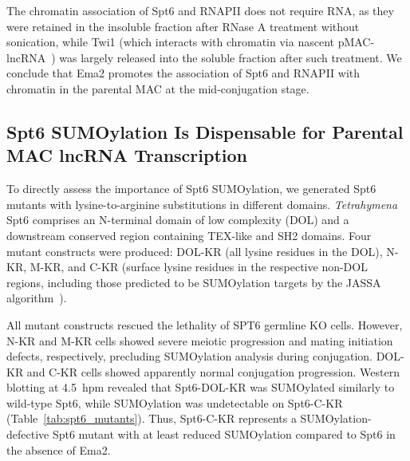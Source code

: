 \documentclass[12pt]{article}
\begin{document}
The chromatin association of Spt6 and RNAPII does not require RNA, as they were retained in the insoluble fraction after RNase A treatment without sonication, while Twi1 (which interacts with chromatin via nascent pMAC-lncRNA~\citep{Aronica2008}) was largely released into the soluble fraction after such treatment.
We conclude that Ema2 promotes the association of Spt6 and RNAPII with chromatin in the parental MAC at the mid-conjugation stage.

\subsection{Spt6 SUMOylation Is Dispensable for Parental MAC lncRNA Transcription}

To directly assess the importance of Spt6 SUMOylation, we generated Spt6 mutants with lysine-to-arginine substitutions in different domains.
\textit{Tetrahymena} Spt6 comprises an N-terminal domain of low complexity (DOL) and a downstream conserved region containing TEX-like and SH2 domains.
Four mutant constructs were produced: DOL-KR (all lysine residues in the DOL), N-KR, M-KR, and C-KR (surface lysine residues in the respective non-DOL regions, including those predicted to be SUMOylation targets by the JASSA algorithm~\citep{Beauclair2015}).

All mutant constructs rescued the lethality of SPT6 germline KO cells.
However, N-KR and M-KR cells showed severe meiotic progression and mating initiation defects, respectively, precluding SUMOylation analysis during conjugation.
DOL-KR and C-KR cells showed apparently normal conjugation progression.
Western blotting at 4.5~hpm revealed that Spt6-DOL-KR was SUMOylated similarly to wild-type Spt6, while SUMOylation was undetectable on Spt6-C-KR (Table~\ref{tab:spt6_mutants}).
Thus, Spt6-C-KR represents a SUMOylation-defective Spt6 mutant with at least reduced SUMOylation compared to Spt6 in the absence of Ema2.
\end{document}
